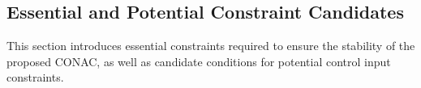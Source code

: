 \documentclass[lettersize,journal]{IEEEtran}
\begin{document}


\subsection{Essential and Potential Constraint Candidates}\label{sec:sub:cstr} 

This section introduces essential constraints required to ensure the stability of the proposed CONAC, as well as candidate conditions for potential control input constraints.
\end{document}
